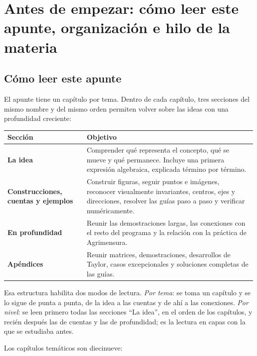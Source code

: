 \chapter{Antes de empezar: cómo leer este apunte, organización e hilo de la materia}\label{cap:00}
\section{Cómo leer este apunte}

El apunte tiene un capítulo por tema. Dentro de cada capítulo, tres secciones del mismo
nombre y del mismo orden permiten volver sobre las ideas con una profundidad creciente:

\begin{center}
\begin{tabularx}{\textwidth}{>{\bfseries}p{34mm} X}
\toprule
Sección & Objetivo\\
\midrule
La idea & Comprender qué representa el concepto, qué se mueve y qué permanece.
Incluye una primera expresión algebraica, explicada término por término.\\
Construcciones, cuentas y ejemplos & Construir figuras, seguir puntos e imágenes, reconocer
visualmente invariantes, centros, ejes y direcciones, resolver las guías paso a paso y
verificar numéricamente.\\
En profundidad & Reunir las demostraciones largas, las conexiones con el resto del programa
y la relación con la práctica de Agrimensura.\\
Apéndices & Reunir matrices, demostraciones, desarrollos de Taylor, casos excepcionales y
soluciones completas de las guías.\\
\bottomrule
\end{tabularx}
\end{center}

Esa estructura habilita dos modos de lectura. \emph{Por tema}: se toma un capítulo y se lo
sigue de punta a punta, de la idea a las cuentas y de ahí a las conexiones. \emph{Por nivel}:
se leen primero todas las secciones ``La idea'', en el orden de los capítulos, y recién
después las de cuentas y las de profundidad; es la lectura en capas con la que se
estudiaba antes.

Los capítulos temáticos son diecinueve:

